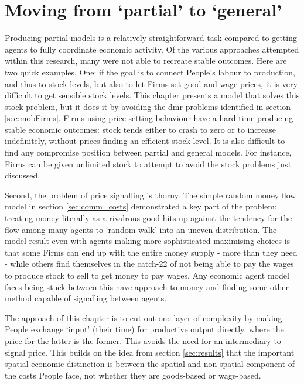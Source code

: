 \section{Moving from `partial' to `general' \label{sec:partialtogeneral}}

Producing partial models is a relatively straightforward task compared to getting agents to fully coordinate economic activity. Of the various approaches attempted within this research, many were not able to recreate stable outcomes. Here are two quick examples. One: if the goal is to connect People's labour to production, and thus to stock levels, but also to let Firms set good and wage prices, it is very difficult to get sensible stock levels. This chapter presents a model that solves this stock problem, but it does it by avoiding the \gls{dmr} problems identified in section \ref{sec:mobFirms}. Firms using price-setting behaviour have a hard time producing stable economic outcomes: stock tends either to crash to zero or to increase indefinitely, without prices finding an efficient stock level. It is also difficult to find any compromise position between partial and general models. For instance, Firms can be given unlimited stock to attempt to avoid the stock problems just discussed. 

Second, the problem of price signalling is thorny. The simple random money flow model in section \ref{sec:comm_costs} demonstrated a key part of the problem: treating money literally as a rivalrous good hits up against the tendency for the flow among many agents to `random walk' into an uneven distribution. The model result even with agents making more sophisticated maximising choices is that some Firms can end up with the entire money supply - more than they need - while others find themselves in the catch-22 of not being able to pay the wages to produce stock to sell to get money to pay wages. Any economic agent model faces being stuck between this na\”{\i}ve approach to money and finding some other method capable of signalling between agents. 

The approach of this chapter is to cut out one layer of complexity by making People exchange `input' (their time) for productive output directly, where the price for the latter is the former. This avoids the need for an intermediary to signal price. This builds on the idea from section \ref{sec:results} that the important spatial economic distinction is between the spatial and non-spatial component of the costs People face, not whether they are goods-based or wage-based. 

